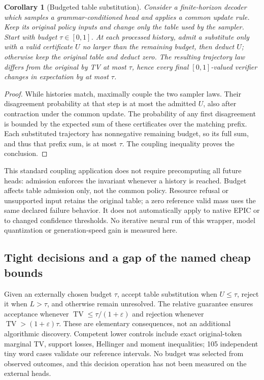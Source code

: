 \documentclass[11pt]{article}
\newtheorem{corollary}{Corollary}
\newcommand{\TV}{\operatorname{TV}}
\begin{document}
\begin{corollary}[Budgeted table substitution]\label{cor:budget}
Consider a finite-horizon decoder which samples a grammar-conditioned head
and applies a common update rule. Keep its original policy inputs and change
only the table used by the sampler. Start with budget $\tau\in[0,1]$. At each
processed history, admit a substitute only with a valid certificate $U$ no
larger than the remaining budget, then deduct $U$; otherwise keep the original
table and deduct zero. The resulting trajectory law differs from the original
by TV at most $\tau$, hence every final $[0,1]$-valued verifier changes in
expectation by at most $\tau$.
\end{corollary}
\begin{proof}
While histories match, maximally couple the two sampler laws. Their
disagreement probability at that step is at most the admitted $U$, also
after contraction under the common update. The probability of any first
disagreement is bounded by the expected sum of these certificates over the
matching prefix. Each substituted trajectory has nonnegative remaining
budget, so its full sum, and thus that prefix sum, is at most $\tau$.
The coupling inequality proves the conclusion.
\end{proof}

This standard coupling application does not require precomputing all future
heads: admission enforces the invariant whenever a history is reached.
Budget affects table admission only, not the common policy. Resource refusal
or unsupported input retains the original table; a zero reference valid mass
uses the same declared failure behavior. It does not automatically apply to
native EPIC or to changed confidence thresholds. No iterative neural run of
this wrapper, model quantization or generation-speed gain is measured here.

\subsection{Tight decisions and a gap of the named cheap bounds}
Given an externally chosen budget $\tau$, accept table substitution when
$U\leq\tau$, reject it when $L>\tau$, and otherwise remain unresolved.
The relative guarantee ensures acceptance whenever
$\TV\leq\tau/(1+\varepsilon)$ and rejection whenever
$\TV>(1+\varepsilon)\tau$. These are elementary consequences, not an
additional algorithmic discovery. Competent lower controls include exact
original-token marginal TV, support losses, Hellinger and moment inequalities;
105 independent tiny word cases validate our reference intervals.
No budget was selected from observed outcomes, and this decision operation
has not been measured on the external heads.
\end{document}
